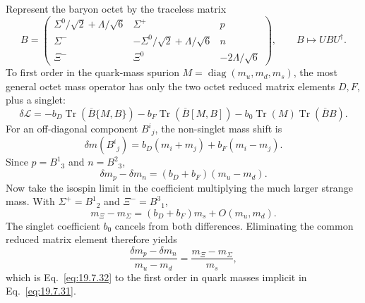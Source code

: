 \begin{enumerate}
  Represent the baryon octet by the traceless matrix
  \[
    B=\begin{pmatrix}
      \Sigma^0/\sqrt2+\Lambda/\sqrt6&\Sigma^+&p\\
      \Sigma^-&-\Sigma^0/\sqrt2+\Lambda/\sqrt6&n\\
      \Xi^-&\Xi^0&-2\Lambda/\sqrt6
    \end{pmatrix},
    \qquad B\longmapsto UBU^\dagger.
  \]
  To first order in the quark-mass spurion
  \(M=\operatorname{diag}(m_u,m_d,m_s)\), the most general octet mass
  operator has only the two octet reduced matrix elements \(D,F\), plus a
  singlet:
  \[
    \delta\mathcal L
      =-b_D\operatorname{Tr}(\overline B\{M,B\})
       -b_F\operatorname{Tr}(\overline B[M,B])
       -b_0\operatorname{Tr}(M)\operatorname{Tr}(\overline BB).
  \]
  For an off-diagonal component \(B^i{}_j\), the non-singlet mass shift is
  \[
    \delta m(B^i{}_j)
      =b_D(m_i+m_j)+b_F(m_i-m_j).
  \]
  Since \(p=B^1{}_3\) and \(n=B^2{}_3\),
  \[
    \delta m_p-\delta m_n
      =(b_D+b_F)(m_u-m_d).
  \]
  Now take the isospin limit in the coefficient multiplying the much
  larger strange mass.  With
  \(\Sigma^+=B^1{}_2\) and \(\Xi^-=B^3{}_1\),
  \[
    m_\Xi-m_\Sigma=(b_D+b_F)m_s
      +O(m_u,m_d).
  \]
  The singlet coefficient \(b_0\) cancels from both differences.
  Eliminating the common reduced matrix element therefore yields
  \[
    \boxed{
    \frac{\delta m_p-\delta m_n}{m_u-m_d}
      =\frac{m_\Xi-m_\Sigma}{m_s},}
  \]
  which is Eq.~\eqref{eq:19.7.32} to the first order in quark masses
  implicit in Eq.~\eqref{eq:19.7.31}.
\end{enumerate}
